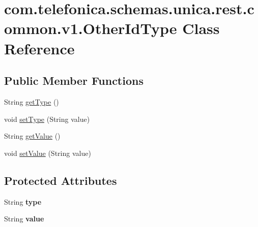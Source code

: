 \hypertarget{classcom_1_1telefonica_1_1schemas_1_1unica_1_1rest_1_1common_1_1v1_1_1OtherIdType}{
\section{com.telefonica.schemas.unica.rest.common.v1.OtherIdType Class Reference}
\label{classcom_1_1telefonica_1_1schemas_1_1unica_1_1rest_1_1common_1_1v1_1_1OtherIdType}
}
\subsection*{Public Member Functions}
\begin{DoxyCompactItemize}
\item 
String \hyperlink{classcom_1_1telefonica_1_1schemas_1_1unica_1_1rest_1_1common_1_1v1_1_1OtherIdType_a118a1649c7d19aab4f84e379320b9adb}{getType} ()
\item 
void \hyperlink{classcom_1_1telefonica_1_1schemas_1_1unica_1_1rest_1_1common_1_1v1_1_1OtherIdType_a4c7f0c169d3d6dd2b987b7a8940051ce}{setType} (String value)
\item 
String \hyperlink{classcom_1_1telefonica_1_1schemas_1_1unica_1_1rest_1_1common_1_1v1_1_1OtherIdType_a1d0fb8aff1a1596ef252756c4a1ff591}{getValue} ()
\item 
void \hyperlink{classcom_1_1telefonica_1_1schemas_1_1unica_1_1rest_1_1common_1_1v1_1_1OtherIdType_a4470d1fb543eaac997a8e1652369a3f9}{setValue} (String value)
\end{DoxyCompactItemize}
\subsection*{Protected Attributes}
\begin{DoxyCompactItemize}
\item 
\hypertarget{classcom_1_1telefonica_1_1schemas_1_1unica_1_1rest_1_1common_1_1v1_1_1OtherIdType_a7e6506fd9003be953e16a0b971b942e1}{
String {\bfseries type}}
\label{classcom_1_1telefonica_1_1schemas_1_1unica_1_1rest_1_1common_1_1v1_1_1OtherIdType_a7e6506fd9003be953e16a0b971b942e1}

\item 
\hypertarget{classcom_1_1telefonica_1_1schemas_1_1unica_1_1rest_1_1common_1_1v1_1_1OtherIdType_af07ffd61e41468ec1b6c35c4138c117e}{
String {\bfseries value}}
\label{classcom_1_1telefonica_1_1schemas_1_1unica_1_1rest_1_1common_1_1v1_1_1OtherIdType_af07ffd61e41468ec1b6c35c4138c117e}

\end{DoxyCompactItemize}


